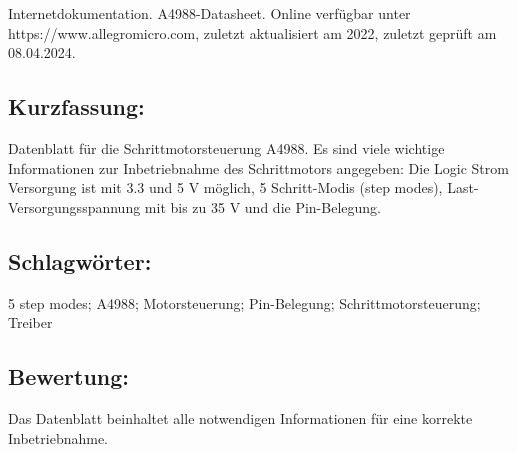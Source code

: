 \hfill
\begin{minipage}{0.48\textwidth}
Internetdokumentation. A4988-Datasheet.
Online verfügbar unter https://www.allegromicro.com, zuletzt aktualisiert am 2022, zuletzt geprüft am 08.04.2024.
\subsection*{Kurzfassung:}
Datenblatt für die Schrittmotorsteuerung A4988. Es sind viele wichtige Informationen zur Inbetriebnahme des Schrittmotors angegeben: Die Logic Strom Versorgung ist mit 3.3 und 5 V möglich, 5 Schritt-Modis (step modes), Last-Versorgungsspannung mit bis zu 35 V und die Pin-Belegung.
\end{minipage}
\subsection*{Schlagwörter:}
5 step modes; A4988; Motorsteuerung; Pin-Belegung; Schrittmotorsteuerung; Treiber
\subsection*{Bewertung:}
Das Datenblatt beinhaltet alle notwendigen Informationen für eine korrekte Inbetriebnahme.

